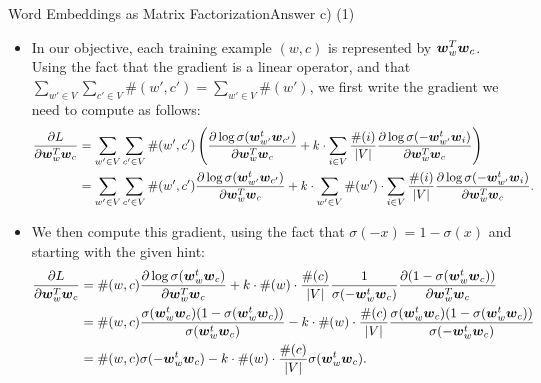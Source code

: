 \documentclass[t]{beamer}
\begin{document}
\begin{frame}{Word Embeddings as Matrix Factorization}{Answer c) (1)}
    \begin{itemize}
        \item In our objective, each training example $(w,c)$ is represented by
              ${\boldsymbol{w}}_w^T{\boldsymbol{w}}_c$.
              Using the fact that the gradient is a linear operator, and that
              $\sum_{w'\in V} \sum_{c'\in V} \#(w',c') = \sum_{w'\in V}\#(w')$,
              we first write the gradient we need to compute as follows:
              {\tiny
              \begin{align*}
                  \frac{\partial L}{\partial {\boldsymbol{w}}_w^T{\boldsymbol{w}}_c} & = \sum_{w'\in V} \sum_{c'\in V} \#(w',c')\left(\frac{\partial \log \sigma({\boldsymbol{w}}_{w'}^t{\boldsymbol{w}}_{c'})}{\partial {\boldsymbol{w}}_w^T{\boldsymbol{w}}_c} + k\cdot \sum_{i\in V} \frac{\#(i)}{|V|}\frac{\partial \log\sigma(-{\boldsymbol{w}}_{w'}^t{\boldsymbol{w}}_i)}{\partial {\boldsymbol{w}}_w^T{\boldsymbol{w}}_c}\right)              \\
                                                           & = \sum_{w'\in V} \sum_{c'\in V} \#(w',c')\frac{\partial \log \sigma({\boldsymbol{w}}_{w'}^t{\boldsymbol{w}}_{c'})}{\partial {\boldsymbol{w}}_w^T{\boldsymbol{w}}_c} + k\cdot\sum_{w'\in V} \#(w')\cdot\sum_{i\in V} \frac{\#(i)}{|V|}\frac{\partial \log\sigma(-{\boldsymbol{w}}_{w'}^t{\boldsymbol{w}}_i)}{\partial {\boldsymbol{w}}_w^T{\boldsymbol{w}}_c}.
              \end{align*}
              }
        \item We then compute this gradient, using the fact that
              $\sigma(-x) = 1 - \sigma(x)$ and starting with the given hint:
              {\tiny
              \begin{align*}
                  \frac{\partial L}{\partial {\boldsymbol{w}}_w^T{\boldsymbol{w}}_c} & =  \#(w,c)\frac{\partial \log \sigma({\boldsymbol{w}}_{w}^t{\boldsymbol{w}}_{c})}{\partial {\boldsymbol{w}}_w^T{\boldsymbol{w}}_c} + k\cdot\#(w)\cdot\frac{\#(c)}{|V|}\frac{1}{\sigma(-{\boldsymbol{w}}_{w}^t{\boldsymbol{w}}_c)}\frac{\partial (1 - \sigma({\boldsymbol{w}}_{w}^t{\boldsymbol{w}}_c))}{\partial {\boldsymbol{w}}_w^T{\boldsymbol{w}}_c}             \\
                                                           & =  \#(w,c)\frac{\sigma({\boldsymbol{w}}_{w}^t{\boldsymbol{w}}_{c})(1 - \sigma({\boldsymbol{w}}_{w}^t{\boldsymbol{w}}_{c}))}{\sigma{({\boldsymbol{w}}_{w}^t{\boldsymbol{w}}_{c})}}  - k\cdot\#(w)\cdot\frac{\#(c)}{|V|}\frac{\sigma({\boldsymbol{w}}_{w}^t{\boldsymbol{w}}_{c})(1 - \sigma({\boldsymbol{w}}_{w}^t{\boldsymbol{w}}_{c}))}{\sigma{(-{\boldsymbol{w}}_{w}^t{\boldsymbol{w}}_{c})}} \\
                                                           & =  \#(w,c)\sigma(-{\boldsymbol{w}}_{w}^t{\boldsymbol{w}}_{c}) - k\cdot\#(w)\cdot\frac{\#(c)}{|V|}\sigma({\boldsymbol{w}}_{w}^t{\boldsymbol{w}}_{c}).
              \end{align*}
              }
    \end{itemize}
\end{frame}
\end{document}
